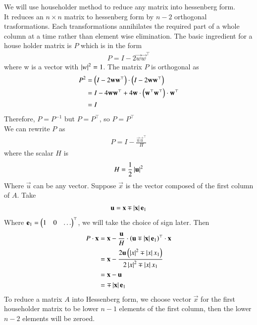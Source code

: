 \documentclass[journal]{IEEEtran}
\begin{document}
We will use householder method to reduce any matrix into hessenberg form.\\
It reduces an $n\times n$ matrix to hessenberg form by $n-2$ orthogonal trasformations. Each transformations annihilates the required part of a whole column at a time rather than element wise elimination. The basic ingredient for a house holder matrix is $P$ which is in the form
\begin{align}
	P = I-2\vec{w}\vec{w}^\top
\end{align}
where w is a vector with $\left\vert w\right\vert^2=1$. The matrix $P$ is orthogonal as
\begin{align}
P^2 &=\left(I - 2\mathbf{w}\mathbf{w}^\top\right)\cdot\left(I - 2\mathbf{w}\mathbf{w}^\top\right)\\
    &=I-4\mathbf{w}\mathbf{w}^\top + 4\mathbf{w}\cdot\left(\mathbf{w}^\top\mathbf{w}^\top\right)\cdot\mathbf{w}^\top\\
    &=I
\end{align}
Therefore, $P=P^{-1}$ but $P = P^\top$, so $P = P^\top$ \\
We can rewrite $P$ as
\begin{align}
	P = I - \frac{\vec{u}\vec{u}^\top}{H}
\end{align}
where the scalar $H$ is
\begin{align}
H = \frac{1}{2}\left\vert\mathbf{u}\right\vert^2
\end{align}
Where $\vec{u}$ can be any vector. Suppose $\vec{x}$ is the vector composed of the first column of $A$. Take
\begin{align}
	\mathbf{u} = \mathbf{x} \mp \left\vert\mathbf{x}\right\vert\mathbf{e}_1
\end{align}
Where $\mathbf{e}_1 = \begin{pmatrix}1 & 0 & \dots\end{pmatrix}^\top$, we will take the choice of sign later. Then
\begin{align}
	P\cdot\mathbf{x} &= \mathbf{x} - \frac{\mathbf{u}}{H}\cdot\left(\mathbf{u}\mp \left\vert\mathbf{x}\right\vert\mathbf{e}_1\right)^\top\cdot \mathbf{x}\\
	              &= \mathbf{x} - \frac{2\mathbf{u}\left(\left\vert x\right\vert^2\mp \left\vert x\right\vert x_1\right)}{2\left\vert x\right\vert^2\mp \left\vert x\right\vert x_1}\\
	              &= \mathbf{x} - \mathbf{u}\\
	              &= \mp\left\vert\mathbf{x}\right\vert\mathbf{e}_1
\end{align}
To reduce a matrix $A$ into Hessenberg form, we choose vector $\vec{x}$ for the first householder matrix to be lower $n-1$ elements of the first column, then the lower $n-2$ elements will be zeroed.
\end{document}

